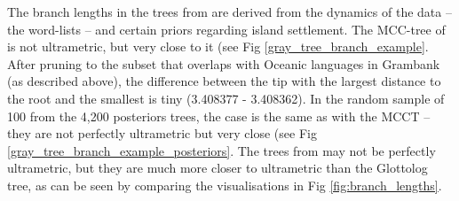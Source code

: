 \documentclass[12pt,letterpaper]{article}
\begin{document}
The branch lengths in the trees from \citet{grayetal_2009} are derived from the dynamics of the data -- the word-lists -- and certain priors regarding island settlement. The MCC-tree of \citet{grayetal_2009} is not ultrametric, but very close to it (see Fig \ref{gray_tree_branch_example}. After pruning to the subset that overlaps with Oceanic languages in Grambank (as described above), the difference between the tip with the largest distance to the root and the smallest is tiny (3.408377 -  3.408362). In the random sample of 100 from the 4,200 posteriors trees, the case is the same as with the MCCT -- they are not perfectly ultrametric but very close (see Fig \ref{gray_tree_branch_example_posteriors}. The trees from \citet{grayetal_2009} may not be perfectly ultrametric, but they are much more closer to ultrametric than the Glottolog tree, as can be seen by comparing the visualisations in Fig \ref{fig:branch_lengths}.
\end{document}
